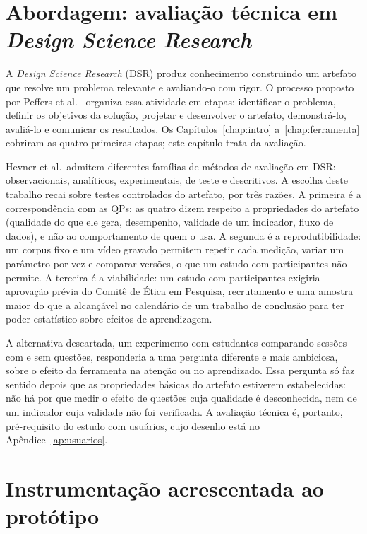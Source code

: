 \documentclass[portuguese,oneside]{tcc}
\newcommand{\estr}[1]{\emph{#1}}
\begin{document}
\section{\label{sec:abordagem}Abordagem: avaliação técnica em \estr{Design Science Research}}

A \estr{Design Science Research} (DSR) produz conhecimento construindo um artefato que resolve um problema relevante e avaliando-o com rigor. O processo proposto por Peffers et al.\ \cite{PTR07} organiza essa atividade em etapas: identificar o problema, definir os objetivos da solução, projetar e desenvolver o artefato, demonstrá-lo, avaliá-lo e comunicar os resultados. Os Capítulos~\ref{chap:intro} a~\ref{chap:ferramenta} cobriram as quatro primeiras etapas; este capítulo trata da avaliação.

Hevner et al.\ admitem diferentes famílias de métodos de avaliação em DSR: observacionais, analíticos, experimentais, de teste e descritivos. A escolha deste trabalho recai sobre testes controlados do artefato, por três razões. A primeira é a correspondência com as QPs: as quatro dizem respeito a propriedades do artefato (qualidade do que ele gera, desempenho, validade de um indicador, fluxo de dados), e não ao comportamento de quem o usa. A segunda é a reprodutibilidade: um corpus fixo e um vídeo gravado permitem repetir cada medição, variar um parâmetro por vez e comparar versões, o que um estudo com participantes não permite. A terceira é a viabilidade: um estudo com participantes exigiria aprovação prévia do Comitê de Ética em Pesquisa, recrutamento e uma amostra maior do que a alcançável no calendário de um trabalho de conclusão para ter poder estatístico sobre efeitos de aprendizagem.

A alternativa descartada, um experimento com estudantes comparando sessões com e sem questões, responderia a uma pergunta diferente e mais ambiciosa, sobre o efeito da ferramenta na atenção ou no aprendizado. Essa pergunta só faz sentido depois que as propriedades básicas do artefato estiverem estabelecidas: não há por que medir o efeito de questões cuja qualidade é desconhecida, nem de um indicador cuja validade não foi verificada. A avaliação técnica é, portanto, pré-requisito do estudo com usuários, cujo desenho está no Apêndice~\ref{ap:usuarios}.

\section{\label{sec:instrumentacao}Instrumentação acrescentada ao protótipo}
\end{document}
